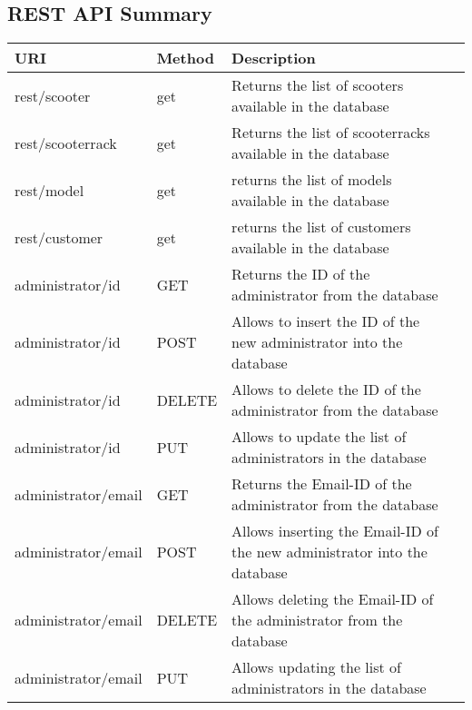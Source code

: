 \subsection{REST API Summary}


\caption{ The list of the rest API for this homweork are still "in progress" because we have to decide according to the frontend where is better to use a REST call or not. There are some resources we used for rest in the next table.}

\begin{longtable}{|p{}|p{} |p{}|p{}|} 
\hline
\textbf{URI} & \textbf{Method} & \textbf{Description}  \\\hline
rest/scooter & get &  Returns the list of scooters available in the database \\\hline
rest/scooterrack & get & Returns the list of scooterracks available in the database \\\hline
rest/model & get & returns the list of models available in the database \\\hline  
rest/customer & get & returns the list of customers available in the database \\\hline



administrator/id & GET & Returns the ID of the administrator from the database\\\hline
administrator/id & POST & Allows to insert the ID of the new administrator into the database \\\hline
administrator/id & DELETE & Allows to delete the ID of the administrator from the database \\\hline
administrator/id & PUT & Allows to update the list of administrators in the database \\\hline


administrator/email & GET & Returns the Email-ID of the administrator from the database\\\hline
administrator/email & POST & Allows inserting the Email-ID of the new administrator into the database \\\hline
administrator/email & DELETE & Allows deleting the Email-ID of the administrator from the database \\\hline
administrator/email & PUT & Allows updating the list of administrators in the database \\\hline





\end{longtable}

